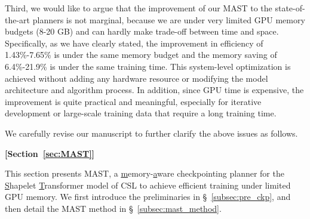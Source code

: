 \begin{sloppypar}
Third, we would like to argue that the improvement of our MAST to the state-of-the-art planners is not marginal, because we are under very limited GPU memory budgets (8-20 GB) and can hardly make trade-off between time and space. Specifically, as we have clearly stated, the improvement in efficiency of 1.43\%-7.65\% is under the same memory budget and the memory saving of 6.4\%-21.9\% is under the same training time. This system-level optimization is achieved without adding any hardware resource or modifying the model architecture and algorithm process. In addition, since GPU time is expensive, the improvement is quite practical and meaningful, especially for iterative development or large-scale training data that require a long training time. 

\renewcommand{\thetable}{\ref{tab:solver_time}}
\begin{table}[t]
    \centering
    \caption{Planning time (in ms) averaged over budget.}
    \vspace{-1.5ex}
    \vspace{-4ex}
\end{table}

We carefully revise our manuscript to further clarify the above issues as follows.
\begin{framed}
    \textbf{[Section~\ref{sec:MAST}]}

    This section presents \textsf{MAST}, a \underline{m}emory-\underline{a}ware checkpointing planner for the \underline{S}hapelet \underline{T}ransformer model of CSL to achieve efficient training under limited GPU memory.  We first introduce the preliminaries in \S~\ref{subsec:pre_ckp}, and then detail the MAST method in \S~\ref{subsec:mast_method}.


\end{framed}
\end{sloppypar}
